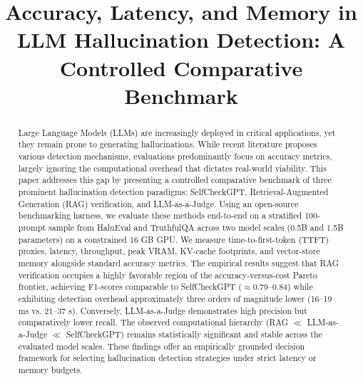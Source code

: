 \documentclass[conference]{IEEEtran}
\begin{document}
\title{Accuracy, Latency, and Memory in LLM Hallucination Detection: A Controlled Comparative Benchmark}

\author{
\and
{}
}

\maketitle

\begin{abstract}
Large Language Models (LLMs) are increasingly deployed in critical applications, yet they remain prone to generating hallucinations. While recent literature proposes various detection mechanisms, evaluations predominantly focus on accuracy metrics, largely ignoring the computational overhead that dictates real-world viability. This paper addresses this gap by presenting a controlled comparative benchmark of three prominent hallucination detection paradigms: SelfCheckGPT, Retrieval-Augmented Generation (RAG) verification, and LLM-as-a-Judge. Using an open-source benchmarking harness, we evaluate these methods end-to-end on a stratified 100-prompt sample from HaluEval and TruthfulQA across two model scales (0.5B and 1.5B parameters) on a constrained 16 GB GPU. We measure time-to-first-token (TTFT) proxies, latency, throughput, peak VRAM, KV-cache footprints, and vector-store memory alongside standard accuracy metrics. The empirical results suggest that RAG verification occupies a highly favorable region of the accuracy-versus-cost Pareto frontier, achieving F1-scores comparable to SelfCheckGPT ($\approx$0.79--0.84) while exhibiting detection overhead approximately three orders of magnitude lower (16--19 ms vs. 21--37 s). Conversely, LLM-as-a-Judge demonstrates high precision but comparatively lower recall. The observed computational hierarchy (RAG $\ll$ LLM-as-a-Judge $\ll$ SelfCheckGPT) remains statistically significant and stable across the evaluated model scales. These findings offer an empirically grounded decision framework for selecting hallucination detection strategies under strict latency or memory budgets.
\end{abstract}
\end{document}
